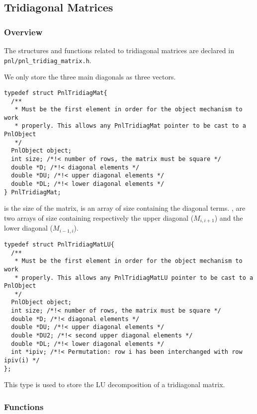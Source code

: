 
\subsection{Tridiagonal Matrices}
\subsubsection{Overview}

The structures and functions related to tridiagonal matrices are declared in
\verb!pnl/pnl_tridiag_matrix.h!. 

We only store the three main diagonals as three vectors.

\begin{verbatim}
typedef struct PnlTridiagMat{
  /**
   * Must be the first element in order for the object mechanism to work
   * properly. This allows any PnlTridiagMat pointer to be cast to a PnlObject
   */
  PnlObject object; 
  int size; /*!< number of rows, the matrix must be square */
  double *D; /*!< diagonal elements */
  double *DU; /*!< upper diagonal elements */
  double *DL; /*!< lower diagonal elements */
} PnlTridiagMat;
\end{verbatim}
 is the size of the matrix,  is an array of size 
containing the diagonal terms. ,
 are two arrays of size  containing respectively the upper
diagonal ($M_{i, i+1}$) and the lower diagonal ($M_{i-1, i}$). 

\begin{verbatim}
typedef struct PnlTridiagMatLU{
  /** 
   * Must be the first element in order for the object mechanism to work
   * properly. This allows any PnlTridiagMatLU pointer to be cast to a PnlObject
   */
  PnlObject object; 
  int size; /*!< number of rows, the matrix must be square */
  double *D; /*!< diagonal elements */
  double *DU; /*!< upper diagonal elements */
  double *DU2; /*!< second upper diagonal elements */
  double *DL; /*!< lower diagonal elements */
  int *ipiv; /*!< Permutation: row i has been interchanged with row ipiv(i) */
};
\end{verbatim}
This type is used to store the LU decomposition of a tridiagonal matrix. 

\subsubsection{Functions}
